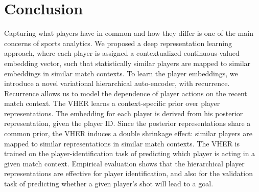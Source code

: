 \documentclass[letterpaper]{article} %
\newcommand{\oliver}[1]{\textcolor{red}{Oliver: #1}}
\begin{document}
\section{Conclusion} Capturing what players have in common and how they differ is one of the main concerns of sports analytics. We proposed a deep representation learning approach, where each player is assigned a contextualized continuous-valued embedding vector, such that statistically similar players are mapped to similar embeddings in similar match contexts. To learn the player embeddings, we introduce a novel variational hierarchical auto-encoder, with recurrence. Recurrence allows us to model the dependence of player actions on the recent match context. The VHER learns a context-specific prior over player representations. The embedding for each player is derived from his posterior representation, given the player ID. Since the posterior representations share a common prior, the VHER induces a double shrinkage effect: similar players are mapped to similar representations in similar match contexts. The VHER is trained on the player-identification task of predicting which player is acting in a given match context. 
Empirical evaluation shows that the hierarchical player representations are effective for player identification, and also for the validation task of predicting whether a given player's shot will lead to a goal.


% 


\appendix

\end{document}
